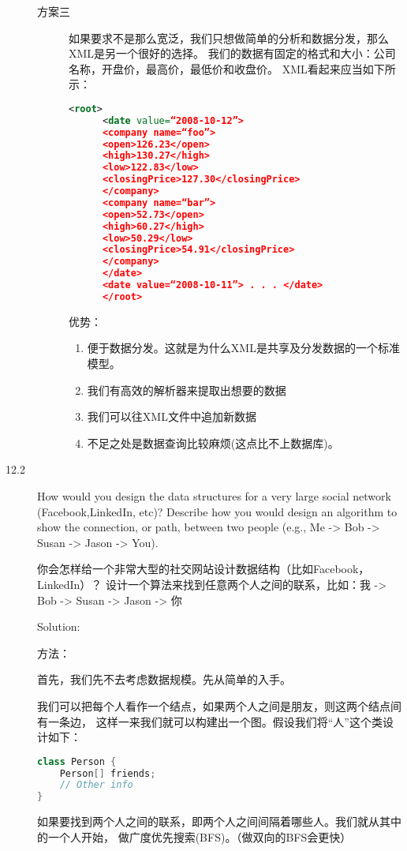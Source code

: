 \begin{description}
\begin{description}
  \item[方案三]
    如果要求不是那么宽泛，我们只想做简单的分析和数据分发，那么XML是另一个很好的选择。 我们的数据有固定的格式和大小：公司名称，开盘价，最高价，最低价和收盘价。 XML看起来应当如下所示：
    \begin{lstlisting}[language=XML]
      <root>
      <date value=“2008-10-12”>
      <company name=“foo”>
      <open>126.23</open>
      <high>130.27</high>
      <low>122.83</low>
      <closingPrice>127.30</closingPrice>
      </company>
      <company name=“bar”>
      <open>52.73</open>
      <high>60.27</high>
      <low>50.29</low>
      <closingPrice>54.91</closingPrice>
      </company>
      </date>
      <date value=“2008-10-11”> . . . </date>
      </root>
    \end{lstlisting}
    优势：
    \begin{enumerate}
    \item 便于数据分发。这就是为什么XML是共享及分发数据的一个标准模型。
    \item 我们有高效的解析器来提取出想要的数据
    \item 我们可以往XML文件中追加新数据
    \item 不足之处是数据查询比较麻烦(这点比不上数据库)。
    \end{enumerate}
  \end{description}


\item[12.2] How would you design the data structures for a very large social network (Facebook,LinkedIn, etc)? Describe how you would design an algorithm to show the connection, or path, between two people (e.g., Me -> Bob -> Susan -> Jason -> You).

你会怎样给一个非常大型的社交网站设计数据结构（比如Facebook，LinkedIn）？ 设计一个算法来找到任意两个人之间的联系，比如：我 -> Bob -> Susan -> Jason -> 你

Solution: 

方法：

首先，我们先不去考虑数据规模。先从简单的入手。

我们可以把每个人看作一个结点，如果两个人之间是朋友，则这两个结点间有一条边， 这样一来我们就可以构建出一个图。假设我们将“人”这个类设计如下：
\begin{lstlisting}[language=C++]
class Person {
    Person[] friends;
    // Other info
}
\end{lstlisting}

如果要找到两个人之间的联系，即两个人之间间隔着哪些人。我们就从其中的一个人开始， 做广度优先搜索(BFS)。（做双向的BFS会更快）


\end{description}
